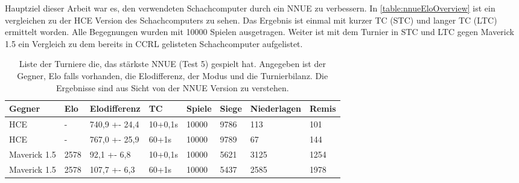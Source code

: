 Hauptziel dieser Arbeit war es, den verwendeten Schachcomputer durch ein \ac{NNUE} zu verbessern. In \autoref{table:nnueEloOverview} ist ein vergleichen zu der \ac{HCE} Version des Schachcomputers zu sehen. Das Ergebnis ist einmal mit kurzer \ac{TC} (\ac{STC}) und langer \ac{TC} (\ac{LTC}) ermittelt worden. Alle Begegnungen wurden mit 10000 Spielen ausgetragen. Weiter ist mit dem Turnier in \ac{STC} und \ac{LTC} gegen Maverick 1.5 ein Vergleich zu dem bereits in \ac{CCRL} \cite{CCRL} gelisteten Schachcomputer aufgelistet.

\begin{table}[ht]
  \caption{Liste der Turniere die, das stärkste \ac{NNUE} (Test 5) gespielt hat. Angegeben ist der Gegner, Elo falls vorhanden, die Elodifferenz, der Modus und die Turnierbilanz. Die Ergebnisse sind aus Sicht von der \ac{NNUE} Version zu verstehen.}
  \label{table:nnueEloOverview}
  \renewcommand{\arraystretch}{1.2}
  \centering
  \sffamily
  \begin{footnotesize}
    \begin{tabular}{l l l l l l l l}
      \toprule
      \textbf{Gegner} & \textbf{Elo} & \textbf{Elodifferenz} & \textbf{\ac{TC}} & \textbf{Spiele} & \textbf{Siege} & \textbf{Niederlagen} & \textbf{Remis} \\
      \midrule
      HCE             & -            & 740,9 +- 24,4         & 10+0,1s          & 10000           & 9786           & 113                  & 101            \\
      HCE             & -            & 767,0 +- 25,9         & 60+1s            & 10000           & 9789           & 67                   & 144            \\
      Maverick 1.5    & 2578         & 92,1  +- 6,8           & 10+0,1s          & 10000           & 5621           & 3125                 & 1254           \\
      Maverick 1.5    & 2578         & 107,7 +- 6,3          & 60+1s            & 10000           & 5437           & 2585                 & 1978           \\
      \bottomrule
    \end{tabular}
  \end{footnotesize}
  \rmfamily
\end{table}